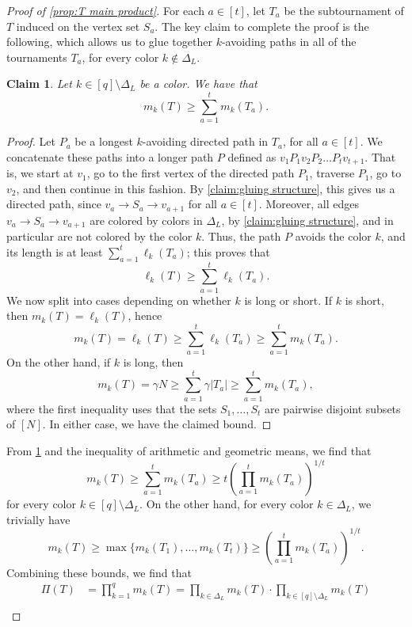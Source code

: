 \documentclass[10pt,a4paper]{amsart}
\newtheorem{claim}{Claim}
\newcommand\ab[1]{\lvert#1\rvert}
\begin{document}
\begin{proof}[Proof of \cref{prop:T main product}]
    For each $a \in [t]$, let $T_a$ be the subtournament of $T$ induced on the vertex set $S_a$. The key claim to complete the proof is the following, which allows us to glue together $k$-avoiding paths in all of the tournaments $T_a$, for every color $k \notin \Delta_L$. 
    \begin{claim}\label{claim:T glue paths}
        Let $k\in [q] \setminus \Delta_L$ be a color. We have that
        \[
            m_k(T) \geq \sum_{a=1}^t m_k(T_a).
        \]
    \end{claim}
    \begin{proof}
        Let $P_a$ be a longest $k$-avoiding directed path in $T_a$, for all $a \in [t]$. We concatenate these paths into a longer path $P$ defined as $v_1P_1v_2P_2 \dots P_t v_{t+1}$. That is, we start at $v_1$, go to the first vertex of the directed path $P_1$, traverse $P_1$, go to $v_2$, and then continue in this fashion. By \cref{claim:gluing structure}, this gives us a directed path, since $v_a \to S_a \to v_{a+1}$ for all $a \in [t]$. Moreover, all edges $v_a \to S_a \to v_{a+1}$ are colored by colors in $\Delta_L$, by \cref{claim:gluing structure}, and in particular are not colored by the color $k$. Thus, the path $P$ avoids the color $k$, and its length is at least $\sum_{a=1}^t \ell_k(T_a)$; this proves that
        \[
            \ell_k(T) \geq \sum_{a=1}^t \ell_k(T_a).
        \]
        We now split into cases depending on whether $k$ is long or short. If $k$ is short, then $m_k(T)=\ell_k(T)$, hence
        \[
            m_k(T)=\ell_k(T) \geq \sum_{a=1}^t \ell_k(T_a) \geq \sum_{a=1}^t m_k(T_a).
        \]
        On the other hand, if $k$ is long, then
        \[
            m_k(T) = \gamma N \geq \sum_{a=1}^t \gamma \ab{T_a} \geq \sum_{a=1}^t m_k(T_a),
        \]
        where the first inequality uses that the sets $S_1,\dots,S_t$ are pairwise disjoint subsets of $[N]$. 
        In either case, we have the claimed bound.
    \end{proof}
    From \cref{claim:T glue paths} and the inequality of arithmetic and geometric means, we find that
    \[
        m_k(T) \geq \sum_{a=1}^t m_k(T_a) \geq t \left( \prod_{a=1}^t m_k(T_a) \right)^{1/t}
    \]
    for every color $k \in [q] \setminus \Delta_L$. On the other hand, for every color $k \in \Delta_L$, we trivially have
    \[
        m_k(T) \geq \max\{m_k(T_1),\dots,m_k(T_t)\} \geq \left( \prod_{a=1}^t m_k(T_a) \right)^{1/t}.
    \]
    Combining these bounds, we find that
    \begin{align*}
        \Pi(T) &= \prod_{k=1}^q m_k(T) =\prod_{k\in \Delta_L} m_k(T) \cdot \prod_{k\in [q] \setminus \Delta_L} m_k(T)\\

\end{align*}
\end{proof}
\end{document}
